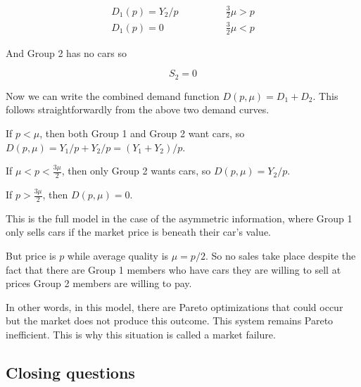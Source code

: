 \documentclass[11pt]{article}
\begin{document}
\begin{align*}
D_1(p) = Y_2/p & \qquad \qquad \frac{3}{2}\mu > p \\
D_1(p) = 0 & \qquad \qquad \frac{3}{2}\mu < p
\end{align*}

And Group 2 has no cars so 

$$S_2 = 0$$

Now we can write the combined demand function $D(p, \mu) = D_1 + D_2$. This follows straightforwardly from the above two demand curves. 

If $p<\mu$, then both Group 1 and Group 2 want cars, so $D(p, \mu) = Y_1/p + Y_2/p = (Y_1 + Y_2)/p$.

If $\mu < p < \frac{3\mu}{2}$, then only Group 2 wants cars, so $D(p, \mu) = Y_2/p$.

If $ p > \frac{3\mu}{2}$, then $D(p, \mu) = 0$. 

This is the full model in the case of the asymmetric information, where Group 1 only sells cars if the market price is beneath their car's value. 

But price is $p$ while average quality is $\mu = p/2$. So no sales take place despite the fact that there are Group 1 members who have cars they are willing to sell at prices Group 2 members are willing to pay.

In other words, in this model, there are Pareto optimizations that could occur but the market does not produce this outcome. This system remains Pareto inefficient. This is why this situation is called a market failure.




\subsection{Closing questions}
\end{document}
